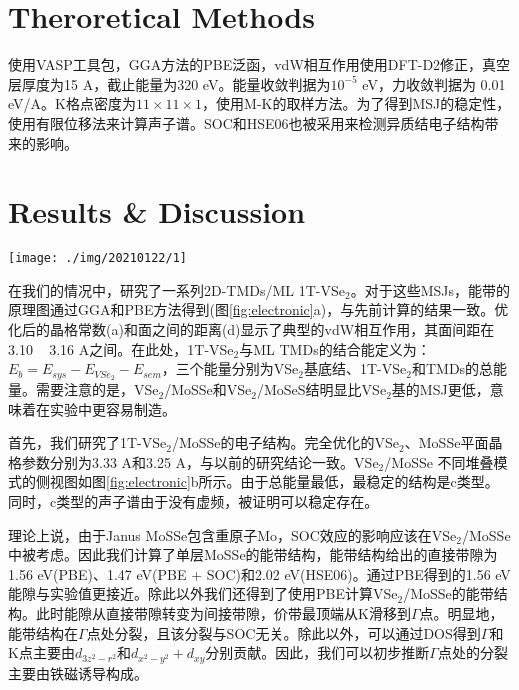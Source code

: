 \documentclass[reprint, aps, prb, showkeys]{revtex4-2}
\begin{document}
\section{Theroretical Methods}
使用VASP工具包，GGA方法的PBE泛函，vdW相互作用使用DFT-D2修正，真空层厚度为15 A，截止能量为320 eV。能量收敛判据为$10^{-5}$ eV，力收敛判据为 0.01 eV/A。K格点密度为$11 \times 11 \times 1$，使用M-K的取样方法。为了得到MSJ的稳定性，使用有限位移法来计算声子谱。SOC和HSE06也被采用来检测异质结电子结构带来的影响。

\section{Results \& Discussion}
\begin{figure*}[t]
    \texttt{[image: ./img/20210122/1]}
    \caption{\label{fig:electronic} 
    (a)VSe$_2$功函数的能带基准和TMDs的能量面；(b)使用不同VSe$_2$/ML MoSSe堆叠方式的侧视图和对应的能量(c);(d)声子谱；(e)c型考虑和不考虑SOC的能带结构。
    }
\end{figure*}
在我们的情况中，研究了一系列2D-TMDs/ML 1T-VSe$_2$。对于这些MSJs，能带的原理图通过GGA和PBE方法得到(图\ref{fig:electronic}a)，与先前计算的结果一致。优化后的晶格常数(a)和面之间的距离(d)显示了典型的vdW相互作用，其面间距在3.10 ~ 3.16 A之间。在此处，1T-VSe$_2$与ML TMDs的结合能定义为：$E_b = E_{sys} - E_{VSe_2} - E_{sem}$，三个能量分别为VSe$_2$基底结、1T-VSe$_2$和TMDs的总能量。需要注意的是，VSe$_2$/MoSSe和VSe$_2$/MoSeS结明显比VSe$_2$基的MSJ更低，意味着在实验中更容易制造。

首先，我们研究了1T-VSe$_2$/MoSSe的电子结构。完全优化的VSe$_2$、MoSSe平面晶格参数分别为3.33 A和3.25 A，与以前的研究结论一致。VSe$_2$/MoSSe 不同堆叠模式的侧视图如图\ref{fig:electronic}b所示。由于总能量最低，最稳定的结构是c类型。同时，c类型的声子谱由于没有虚频，被证明可以稳定存在。

理论上说，由于Janus MoSSe包含重原子Mo，SOC效应的影响应该在VSe$_2$/MoSSe中被考虑。因此我们计算了单层MoSSe的能带结构，能带结构给出的直接带隙为1.56 eV(PBE)、1.47 eV(PBE + SOC)和2.02 eV(HSE06)。通过PBE得到的1.56 eV能隙与实验值更接近。除此以外我们还得到了使用PBE计算VSe$_2$/MoSSe的能带结构。此时能隙从直接带隙转变为间接带隙，价带最顶端从K滑移到$\Gamma$点。明显地，能带结构在$\Gamma$点处分裂，且该分裂与SOC无关。除此以外，可以通过DOS得到$\Gamma$和K点主要由$d_{3z^2 - r^2}$和$d_{x^2 - y^2} + d_{xy}$分别贡献。因此，我们可以初步推断$\Gamma$点处的分裂主要由铁磁诱导构成。
\end{document}
